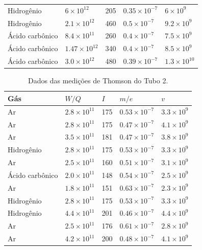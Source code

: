 \begin{enumerate}[label=\textbf{\arabic{chapter}.\arabic*.}]
\begin{table}
\begin{tabular}{|l|l|l|l|l|}
			Hidrogênio & $6 \times 10^{12}$ & 205 & $0.35 \times 10^{-7}$ & $6 \times 10^{9}$ \\
			Hidrogênio & $2.1 \times 10^{12}$ & 460 & $0.5 \times 10^{-7}$ & $9.2 \times 10^{9}$ \\
			Ácido carbônico & $8.4 \times 10^{11}$ & 260 & $0.4 \times 10^{-7}$ & $7.5 \times 10^{9}$ \\
			Ácido carbônico & $1.47 \times 10^{12}$ & 340 & $0.4 \times 10^{-7}$ & $8.5 \times 10^{9}$ \\
			Ácido carbônico & $3.0 \times 10^{12}$ & 480 & $0.39 \times 10^{-7}$ & $1.3 \times 10^{10}$ \\
			\hline
		\end{tabular}
		\label{tab:2-1}
	\end{table}
	
	\begin{table}
		\centering
		\caption{Dados das medições de Thomson do Tubo 2.}
		\begin{tabular}{|l|l|l|l|l|}
			\hline
			Gás & $W/Q$ & $I$ & $m/e$ & $v$ \\
			\hline
			Ar & $2.8 \times 10^{11}$ & 175 & $0.53 \times 10^{-7}$ & $3.3 \times 10^{9}$ \\
			Ar & $2.8 \times 10^{11}$ & 175 & $0.47 \times 10^{-7}$ & $4.1 \times 10^{9}$ \\
			Ar & $3.5 \times 10^{11}$ & 181 & $0.47 \times 10^{-7}$ & $3.8 \times 10^{9}$ \\
			Hidrogênio & $2.8 \times 10^{11}$ & 175 & $0.53 \times 10^{-7}$ & $3.3 \times 10^{9}$ \\
			Ar & $2.5 \times 10^{11}$ & 160 & $0.51 \times 10^{-7}$ & $3.1 \times 10^{9}$ \\
			Ácido carbônico & $2.0 \times 10^{11}$ & 148 & $0.54 \times 10^{-7}$ & $2.5 \times 10^{9}$ \\
			Ar & $1.8 \times 10^{11}$ & 151 & $0.63 \times 10^{-7}$ & $2.3 \times 10^{9}$ \\
			Hidrogênio & $2.8 \times 10^{11}$ & 175 & $0.53 \times 10^{-7}$ & $3.3 \times 10^{9}$ \\
			Hidrogênio & $4.4 \times 10^{11}$ & 201 & $0.46 \times 10^{-7}$ & $4.4 \times 10^{9}$ \\
			Ar & $2.5 \times 10^{11}$ & 176 & $0.61 \times 10^{-7}$ & $2.8 \times 10^{9}$ \\
			Ar & $4.2 \times 10^{11}$ & 200 & $0.48 \times 10^{-7}$ & $4.1 \times 10^{9}$ \\
			\hline
		\end{tabular}
		\label{tab:2-2}
	\end{table}
	

\end{enumerate}
